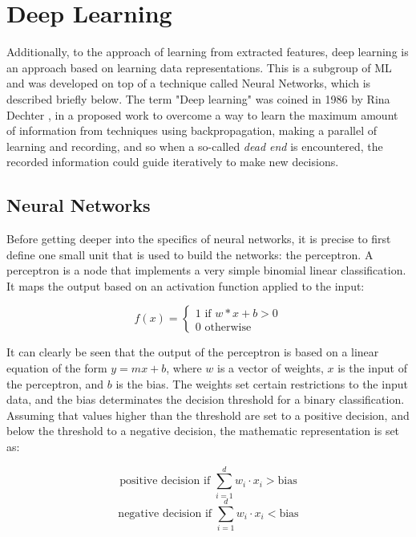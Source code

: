\section{Deep Learning}
Additionally, to the approach of learning from extracted features, deep learning is an approach based on learning data representations. This is a subgroup of \ac{ML} and was developed on top of a technique called Neural Networks, which is described briefly below. The term "Deep learning" was coined in 1986 by Rina Dechter \cite{Dechter}, in a proposed work to overcome a way to learn the maximum amount of information from techniques using backpropagation, making a parallel of learning and recording, and so when a so-called \emph{dead end} is encountered, the recorded information could guide iteratively to make new decisions.

\subsection{Neural Networks}\label{ch:neural}
Before getting deeper into the specifics of neural networks, it is precise to first define one small unit that is used to build the networks: the perceptron. A perceptron is a node that implements a very simple binomial linear classification. It maps the output based on an activation function applied to the input:

\begin{equation}
    f(x) =
    \begin{cases}
        1 \text{ if } w*x + b > 0\\
        0 \text{ otherwise}
    \end{cases}
\end{equation}

It can clearly be seen that the output of the perceptron is based on a linear equation of the form \(y=mx+b\), where \(w\) is a vector of weights, \(x\) is the input of the perceptron, and \(b\) is the bias. The weights set certain restrictions to the input data, and the bias determinates the decision threshold for a binary classification. Assuming that values higher than the threshold are set to a positive decision, and below the threshold to a negative decision, the mathematic representation is set as:

\begin{equation}
    \text{positive decision if } \sum_{i=1}^{d} w_i\cdot x_i > \text{bias}
\end{equation}
\begin{equation}
    \text{negative decision if } \sum_{i=1}^{d} w_i\cdot x_i < \text{bias}
\end{equation}

